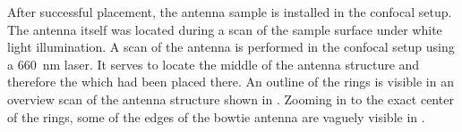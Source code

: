 			After successful placement, the antenna sample is installed in the confocal setup.
			The antenna itself was located during a scan of the sample surface under white light illumination.
			A scan of the antenna is performed in the confocal setup using a \SI{660}{nm} \cw laser.
			It serves to locate the middle of the antenna structure and therefore the \nd which had been placed there.
			An outline of the rings is visible in an overview scan of the antenna structure shown in .
			Zooming in to the exact center of the rings, some of the edges of the bowtie antenna are vaguely visible in .

			\begin{figure}[!htb]
				\begin{subfigure}{ 0.49\linewidth}
					\centering
					\caption{}
					\label{subfig::antenna_laser_scan}
				\end{subfigure}
				\hfill
				\begin{subfigure}{ 0.49\linewidth}
					\centering

\end{subfigure}
\end{figure}
